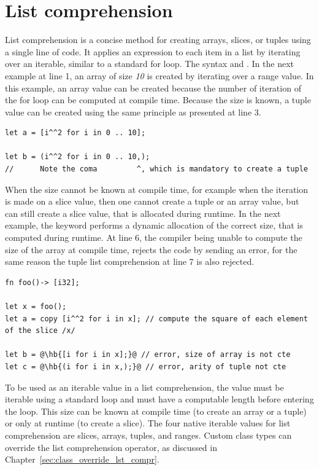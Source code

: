\section{List comprehension}%
\label{sec:list_compr}

List comprehension is a concise method for creating arrays, slices, or tuples
using a single line of code. It applies an expression to each item in a list by
iterating over an iterable, similar to a standard for loop. The syntax  and . In the next
example at line 1, an array of size \textit{10} is created by iterating over a
range value. In this example, an array value can be created because the number
of iteration of the for loop can be computed at compile time. Because the size
is known, a tuple value can be created using the same principle as presented at
line 3.

\begin{lstlisting}[style=coloredverbatim]
let a = [i^^2 for i in 0 .. 10];

let b = (i^^2 for i in 0 .. 10,);
//      Note the coma         ^, which is mandatory to create a tuple
\end{lstlisting}

When the size cannot be known at compile time, for example when the iteration is
made on a slice value, then one cannot create a tuple or an array value, but can
still create a slice value, that is allocated during runtime. In the next
example, the keyword  performs a dynamic allocation of the correct
size, that is computed during runtime. At line 6, the compiler being unable to
compute the size of the array at compile time, rejects the code by sending an
error, for the same reason the tuple list comprehension at line 7 is also
rejected.

\begin{lstlisting}[style=coloredverbatimError, escapechar=@]
fn foo()-> [i32];

let x = foo();
let a = copy [i^^2 for i in x]; // compute the square of each element of the slice /x/

let b = @\hb{[i for i in x];}@ // error, size of array is not cte
let c = @\hb{(i for i in x,);}@ // error, arity of tuple not cte
\end{lstlisting}

To be used as an iterable value in a list comprehension, the value must be
iterable using a standard  loop and must have a computable length
before entering the loop. This size can be known at compile time (to create an
array or a tuple) or only at runtime (to create a slice). The four native
iterable values for list comprehension are slices, arrays, tuples, and ranges.
Custom class types can override the list comprehension operator, as discussed in
Chapter~\ref{sec:class_override_lst_compr}.

